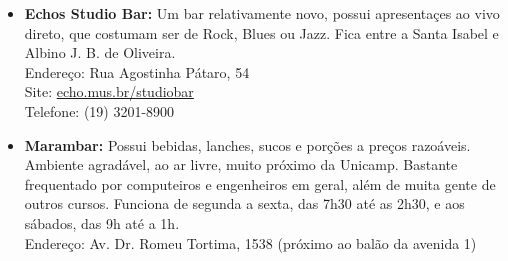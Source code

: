 \begin{itemize}
    \item   \textbf{Echos Studio Bar:} Um bar relativamente novo, possui
        apresentaçes ao vivo direto, que costumam ser de Rock, Blues ou Jazz.
        Fica entre a Santa Isabel e Albino J. B. de Oliveira.
        \\Endereço: Rua Agostinha Pátaro, 54
        \\Site: \url{echo.mus.br/studiobar}
        \\Telefone: (19) 3201-8900

    \item   \textbf{Marambar:} Possui bebidas, lanches, sucos e porções a preços
        razoáveis. Ambiente agradável, ao ar livre, muito próximo da Unicamp.
        Bastante frequentado por computeiros e engenheiros em geral, além de
        muita gente de outros cursos. Funciona de segunda a sexta, das 7h30 até
        as 2h30, e aos sábados, das 9h até a 1h.
        \\Endereço: Av. Dr. Romeu Tortima, 1538 (próximo ao balão da avenida 1)
\end{itemize}
